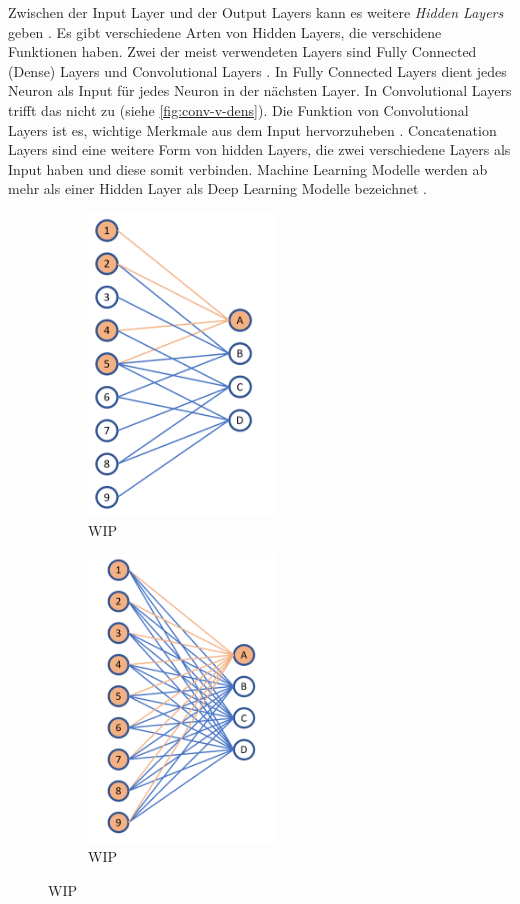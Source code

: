 Zwischen der Input Layer und der Output Layers kann es weitere \emph{Hidden
Layers} geben \cite{malik_what_2019}. Es gibt verschiedene Arten von Hidden
Layers, die verschidene Funktionen haben. Zwei der meist verwendeten Layers sind
Fully Connected (Dense) Layers und Convolutional Layers
\cite{unzueta_convolutional_2022}. In Fully Connected Layers dient jedes Neuron
als Input für jedes Neuron in der nächsten Layer. In Convolutional Layers trifft
das nicht zu (siehe \autoref{fig:conv-v-dens}). Die Funktion von Convolutional
Layers ist es, wichtige Merkmale aus dem Input hervorzuheben
\cite{deshpande_beginners_nodate}. Concatenation Layers
\cite{jayawardana_concatenating_2021} sind eine weitere Form von hidden Layers,
die zwei verschiedene Layers als Input haben und diese somit verbinden. Machine
Learning Modelle werden ab mehr als einer Hidden Layer als Deep Learning Modelle
bezeichnet \cite{jan-dirk_kranz_deep_2019}.

\begin{figure}[htp]
    \begin{subfigure}[b]{0.5\textwidth}
        \centering
        \includegraphics[width=5cm]{images/theorie/conv-v-dens.png}
        \caption{WIP}
        \label{fig:conv-v-dens}
    \end{subfigure}
    \begin{subfigure}[b]{0.5\textwidth}
        \centering
        \includegraphics[width=5cm]{images/theorie/dens-v-conv.png}
        \caption{WIP}
    \end{subfigure}
    \hfill
\end{figure}


